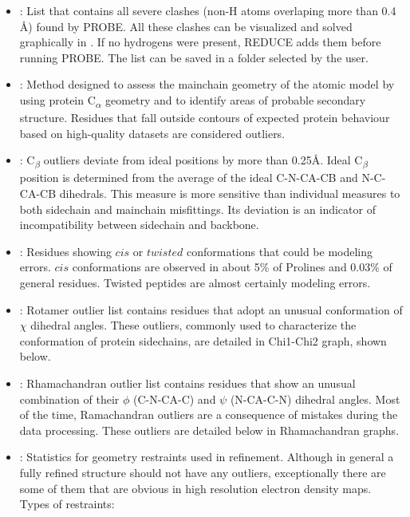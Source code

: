 \begin{itemize}
\begin{itemize}
        \begin{itemize}
         \item {}: List that contains all severe clashes (non-H atoms overlaping more than 0.4 \AA) found by PROBE. All these clashes can be visualized and solved graphically in \coot. If no hydrogens were present, REDUCE adds them before running PROBE. The list can be saved in a folder selected by the user.
         \item {}: Method designed to assess the mainchain geometry of the atomic model by using protein C\textsubscript{$\alpha$}\xspace geometry and to identify areas of probable secondary structure. Residues that fall outside contours of expected protein behaviour based on high-quality datasets are considered outliers.
         \item {}: C\textsubscript{$\beta$}\xspace outliers deviate from ideal positions by more than 0.25\AA. Ideal C\textsubscript{$\beta$}\xspace position is determined from the average of the ideal C-N-CA-CB and N-C-CA-CB dihedrals. This measure is more sensitive than individual measures to both sidechain and mainchain misfittings. Its deviation is an indicator of incompatibility between sidechain and backbone. 
         \item {}: Residues showing $cis$ or $twisted$ conformations that could be modeling errors. $cis$ conformations are observed in about 5\% of Prolines and 0.03\% of general residues. Twisted peptides are almost certainly modeling errors.
         \item {}: Rotamer outlier list contains residues that adopt an unusual conformation of $\chi$ dihedral angles. These outliers, commonly used to characterize the conformation of protein sidechains, are detailed in Chi1-Chi2 graph, shown below.
         \item {}: Rhamachandran outlier list contains residues that show an unusual combination of their $\phi$ (C-N-CA-C) and $\psi$ (N-CA-C-N) dihedral angles. Most of the time, Ramachandran outliers are a consequence of mistakes during the data processing. These outliers are detailed below in Rhamachandran graphs.
         \item {}: Statistics for geometry restraints used in refinement. Although in general a fully refined structure should not have any outliers, exceptionally there are some of them that are obvious in high resolution electron density maps. Types of restraints:

\end{itemize}
\end{itemize}
\end{itemize}
